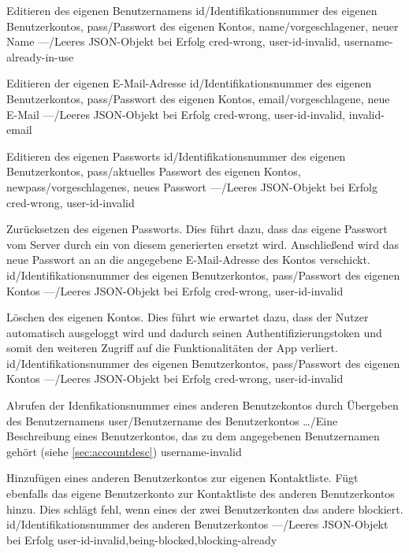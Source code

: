 \documentclass[parskip=full,11pt]{scrartcl}
\begin{document}
{Editieren des eigenen Benutzernamens}
{id/Identifikationsnummer des eigenen Benutzerkontos,
pass/Passwort des eigenen Kontos,
name/vorgeschlagener{,} neuer Name}
{---/Leeres JSON-Objekt bei Erfolg}
{cred-wrong, user-id-invalid, username-already-in-use}

{Editieren der eigenen E-Mail-Adresse}
{id/Identifikationsnummer des eigenen Benutzerkontos,
pass/Passwort des eigenen Kontos,
email/vorgeschlagene{,} neue E-Mail}
{---/Leeres JSON-Objekt bei Erfolg}
{cred-wrong, user-id-invalid, invalid-email}\

{Editieren des eigenen Passworts}
{id/Identifikationsnummer des eigenen Benutzerkontos,
pass/aktuelles Passwort des eigenen Kontos,
newpass/vorgeschlagenes{,} neues Passwort}
{---/Leeres JSON-Objekt bei Erfolg}
{cred-wrong, user-id-invalid}

{Zurücksetzen des eigenen Passworts. Dies führt dazu, dass das eigene Passwort
vom Server durch ein von diesem generierten ersetzt wird. Anschließend wird das
neue Passwort an an die angegebene E-Mail-Adresse des Kontos verschickt.}
{id/Identifikationsnummer des eigenen Benutzerkontos,
pass/Passwort des eigenen Kontos}
{---/Leeres JSON-Objekt bei Erfolg}
{cred-wrong, user-id-invalid}

{Löschen des eigenen Kontos. Dies führt wie erwartet dazu{,}
dass der Nutzer automatisch ausgeloggt wird und dadurch seinen
Authentifizierungstoken und somit den weiteren Zugriff auf die Funktionalitäten
der App verliert.}
{id/Identifikationsnummer des eigenen Benutzerkontos,
pass/Passwort des eigenen Kontos}
{---/Leeres JSON-Objekt bei Erfolg}
{cred-wrong, user-id-invalid}

{Abrufen der Idenfikationsnummer eines anderen Benutzekontos durch Übergeben
des Benutzernamens}
{user/Benutzername des Benutzerkontos}
{\dots/Eine Beschreibung eines Benutzerkontos{,} das zu dem angegebenen
Benutzernamen gehört (siehe \ref{sec:accountdesc})}
{username-invalid}

{Hinzufügen eines anderen Benutzerkontos zur eigenen Kontaktliste.
Fügt ebenfalls das eigene Benutzerkonto zur Kontaktliste des anderen
Benutzerkontos hinzu.
Dies schlägt fehl, wenn eines der zwei Benutzerkonten das andere blockiert.}
{id/Identifikationsnummer des anderen Benutzerkontos}
{---/Leeres JSON-Objekt bei Erfolg}
{user-id-invalid,being-blocked,blocking-already}
\end{document}
